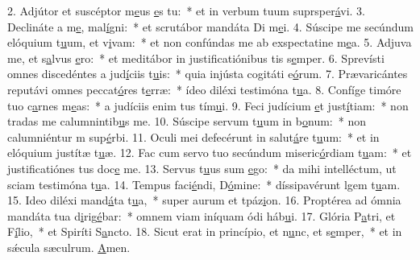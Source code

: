 2. Adjútor et suscéptor m\uline{e}us \uline{e}s tu:~* et in verbum tuum suprsper\uline{á}vi.
3. Declináte a m\uline{e}, mal\uline{í}gni:~* et scrutábor mandáta Di m\uline{e}i.
4. Súscipe me secúndum elóquium t\uline{u}um, et v\uline{i}vam:~* et non confúndas me ab exspectatine m\uline{e}a.
5. Adjuva me, et s\uline{a}lvus \uline{e}ro:~* et meditábor in justificatiónibus tis s\uline{e}mper.
6. Sprevísti omnes discedéntes a jud\uline{í}ciis t\uline{u}is:~* quia injústa cogitáti e\uline{ó}rum.
7. Prævaricántes reputávi omnes peccat\uline{ó}res t\uline{e}rræ:~* ídeo diléxi testimóna t\uline{u}a.
8. Confíge timóre tuo c\uline{a}rnes m\uline{e}as:~* a judíciis enim tus tím\uline{u}i.
9. Feci judícium \uline{e}t just\uline{í}tiam:~* non tradas me calumnintib\uline{u}s me.
10. Súscipe servum t\uline{u}um in b\uline{o}num:~* non calumniéntur m sup\uline{é}rbi.
11. Oculi mei defecérunt in salut\uline{á}re t\uline{u}um:~* et in elóquium justítæ t\uline{u}æ.
12. Fac cum servo tuo secúndum miseric\uline{ó}rdiam t\uline{u}am:~* et justificatiónes tus doc\uline{e} me.
13. Servus t\uline{u}us sum \uline{e}go:~* da mihi intelléctum, ut sciam testimóna t\uline{u}a.
14. Tempus faci\uline{é}ndi, D\uline{ó}mine:~* díssipavérunt lgem t\uline{u}am.
15. Ideo diléxi mand\uline{á}ta t\uline{u}a,~* super aurum et tpáz\uline{i}on.
16. Proptérea ad ómnia mandáta tua d\uline{i}rig\uline{é}bar:~* omnem viam iníquam ódi háb\uline{u}i.
17. Glória P\uline{a}tri, et F\uline{í}lio,~* et Spiríti S\uline{a}ncto.
18. Sicut erat in princípio, et n\uline{u}nc, et s\uline{e}mper,~* et in sǽcula sæculrum. \uline{A}men.
